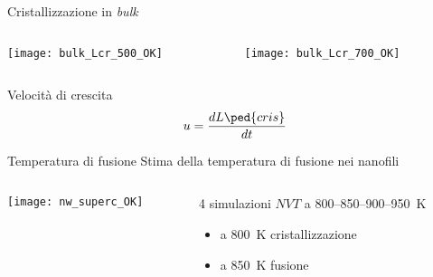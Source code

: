 \documentclass{beamer}
\begin{document}
\begin{frame}{Cristallizzazione in \gete \emph{bulk}}
{\begin{columns}
\begin{column}{0.5\textwidth}
    \texttt{[image: bulk\_Lcr\_500\_OK]}
   \end{column}
   \begin{column}{0.5\textwidth}
    \texttt{[image: bulk\_Lcr\_700\_OK]}
   \end{column}
  \end{columns}
 \vspace{.5cm}
 \centering
 Velocità di crescita
 \[ u = \frac{dL\ped{cris}}{dt} \]
}
\end{frame}



\begin{frame}{Temperatura di fusione}
\centering
Stima della temperatura di fusione nei nanofili\\[12pt]
\begin{columns}
\begin{column}{0.4\textwidth}
\texttt{[image: nw\_superc\_OK]}
\end{column}
%
\begin{column}{0.6\textwidth}
 4 simulazioni $NVT$ a \num{800}--\num{850}--\num{900}--\SI{950}{K}%
  \begin{itemize}
    \item a \SI{800}{K} {\ev cristallizzazione}
    \item a \SI{850}{K} {\ev fusione}
  \end{itemize}
\end{column}
\end{columns}

\end{frame}



\end{document}
